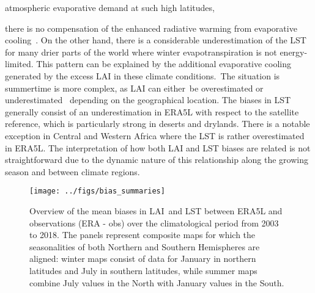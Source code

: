 \documentclass[gmd, manuscript]{copernicus}
\begin{document}
atmospheric evaporative demand at such high latitudes,~{there is no
compensation of the enhanced radiative warming from evaporative
cooling~\citep{bright2017local}. On the other hand, there is a considerable
underestimation of the LST for many drier parts of the world where
winter evapotranspiration is not energy-limited. This pattern can be
explained by the additional evaporative cooling generated by the excess
LAI in these climate conditions.~The situation is summertime is more
complex, as LAI can either~be overestimated or underestimated~ depending
on the geographical location. The biases in LST generally consist of an
underestimation in ERA5L with respect to the satellite reference, which
is particularly strong in deserts and drylands. There is a notable
exception in Central and Western Africa where the LST is rather
overestimated in ERA5L. The interpretation of how both LAI and LST
biases are related is not straightforward due to the dynamic nature of
this relationship along the growing season and between climate regions.~

\par\null{}
\begin{figure}[H]
\begin{center}
\texttt{[image: ../figs/bias\_summaries]}
\caption{{{Overview of the mean biases} in LAI~and LST between ERA5L and
observations (ERA - obs) over the climatological period from 2003 to
2018. The panels represent composite maps for which the seasonalities of
both Northern and Southern Hemispheres are aligned: winter maps consist
of data for January in northern latitudes and July in southern
latitudes, while summer maps combine July values in the North with
January values in the South.
{\label{220254}}%
}}
\end{center}
\end{figure}

\par\null

}
\end{document}
